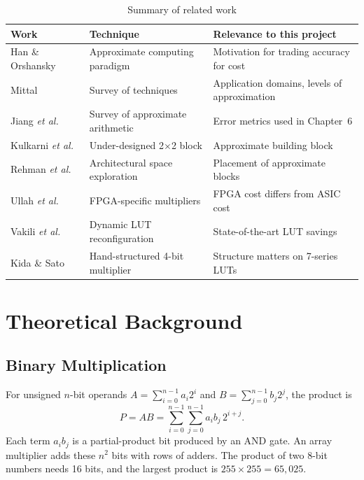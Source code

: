 \documentclass[12pt,a4paper,oneside]{report}
\begin{document}
\begin{table}[ht]
\centering
\caption{Summary of related work}
\label{tab:lit}
\small
\begin{tabular}{p{3.2cm}p{4.3cm}p{5.8cm}}
\toprule
Work & Technique & Relevance to this project \\
\midrule
Han \& Orshansky~\cite{han2013approximate} & Approximate computing paradigm & Motivation for trading accuracy for cost \\
Mittal~\cite{mittal2016survey} & Survey of techniques & Application domains, levels of approximation \\
Jiang \emph{et al.}~\cite{jiang2020survey} & Survey of approximate arithmetic & Error metrics used in Chapter~6 \\
Kulkarni \emph{et al.}~\cite{kulkarni2011udm} & Under-designed 2$\times$2 block & Approximate building block \\
Rehman \emph{et al.}~\cite{rehman2016space} & Architectural space exploration & Placement of approximate blocks \\
Ullah \emph{et al.}~\cite{ullah2022fpga} & FPGA-specific multipliers & FPGA cost differs from ASIC cost \\
Vakili \emph{et al.}~\cite{vakili2024dyrecmul} & Dynamic LUT reconfiguration & State-of-the-art LUT savings \\
Kida \& Sato~\cite{kida2025fourbit} & Hand-structured 4-bit multiplier & Structure matters on 7-series LUTs \\
\bottomrule
\end{tabular}
\end{table}

\chapter{Theoretical Background}

\section{Binary Multiplication}
For unsigned $n$-bit operands $A=\sum_{i=0}^{n-1}a_i2^i$ and $B=\sum_{j=0}^{n-1}b_j2^j$, the product is
\begin{equation}
P = AB = \sum_{i=0}^{n-1}\sum_{j=0}^{n-1} a_ib_j\,2^{i+j}.
\end{equation}
Each term $a_ib_j$ is a partial-product bit produced by an AND gate. An array multiplier adds these $n^2$ bits with rows of adders. The product of two 8-bit numbers needs 16 bits, and the largest product is $255\times255=65{,}025$.
\end{document}
